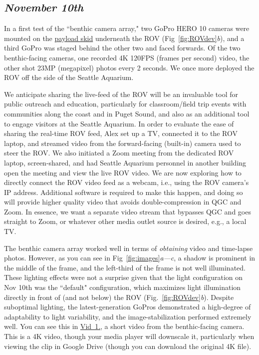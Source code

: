 \documentclass[11pt]{article}
\begin{document}
\subsection{\textit{November 10th}}
In a first test of the ``benthic camera array," two GoPro HERO 10 
cameras were mounted on the 
\href{https://www.bluerobotics.com/store/rov/bluerov2-accessories/brov-payload-skid/}{payload
 skid} underneath the ROV (Fig~\ref{fig:ROVdev}\textit{b}), and a third 
GoPro was staged behind the other two and faced forwards.
Of the two benthic-facing cameras, one recorded 4K 120FPS (frames per 
second) video, the other shot 23MP (megapixel) photos every 2 seconds.
We once more deployed the ROV off the side of the Seattle Aquarium. 
	
We anticipate sharing the live-feed of the ROV will be an invaluable 
tool for public outreach and education, particularly for 
classroom/field trip events with communities along the coast and in 
Puget Sound, and also as an additional tool to engage visitors at the 
Seattle Aquarium. 
In order to evaluate the ease of sharing the real-time ROV feed, Alex 
set up a TV, connected it to the ROV laptop, and streamed video from 
the forward-facing (built-in) camera used to steer the ROV. 
We also initiated a Zoom meeting from the dedicated ROV laptop, 
screen-shared, and had Seattle Aquarium personnel in another building 
open the meeting and view the live ROV video. 
We are now exploring how to directly connect the ROV video feed as a 
webcam, i.e., using the ROV camera's IP address. 
Additional software is required to make this happen, and doing so will 
provide higher quality video that avoids double-compression in QGC and 
Zoom. 
In essence, we want a separate video stream that bypasses QGC and 
goes straight to Zoom, or whatever other media outlet source is 
desired, e.g., a local TV. 
		
The benthic camera array worked well in terms of \textit{obtaining} 
video and time-lapse photos. 
However, as you can see in Fig~\ref{fig:images}\textit{a---c}, a shadow 
is prominent in the middle of the frame, and the left-third
of the frame is not well illuminated. 
These lighting effects were not a surprise given that the light 
configuration on Nov 10th was the ``default" configuration, which 
maximizes light illumination directly in front of (and not below) the 
ROV (Fig.~\ref{fig:ROVdev}\textit{b}).
Despite suboptimal lighting, the latest-generation GoPros 
demonstrated a high-degree of adaptability to light variability, and the
image-stabilization performed extremely well. 
You can see this in 
\href{https://drive.google.com/file/d/1RKhWZ2E1E4xGpWKGdaA42evfIxkJVx0c/view?usp=sharing}{Vid~1.},
 a short video from the benthic-facing camera. 
This is a 4K video, though your media player will downscale it, 
particularly when viewing the clip in Google Drive (though you can 
download the original 4K file). 
	
\end{document}
